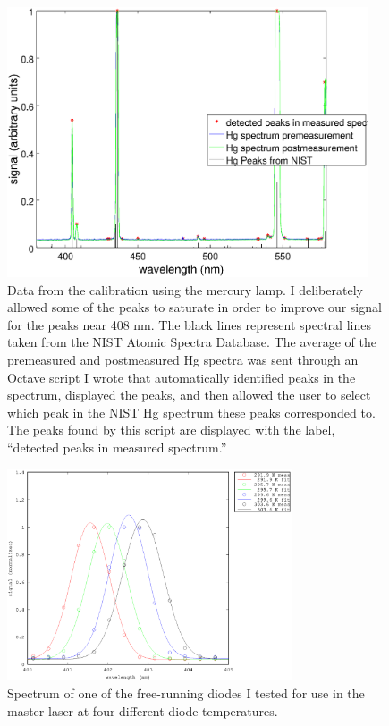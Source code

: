 \begin{figure}
\centering
\includegraphics[width=0.95\textwidth]{calibrationData.eps} 
\caption[Calibration spectrum from Hg lamp]{\label{calibrationData} Data from the calibration using the mercury lamp. I deliberately allowed some of the peaks to saturate in order to improve our signal for the peaks near 408 nm. The black lines represent spectral lines taken from the NIST Atomic Spectra Database\cite{NISTasd}. The average of the premeasured and postmeasured Hg spectra was sent through an Octave script I wrote that automatically identified peaks in the spectrum, displayed the peaks, and then allowed the user to select which peak in the NIST Hg spectrum these peaks corresponded to. The peaks found by this script are displayed with the label, ``detected peaks in measured spectrum.''}
\end{figure}

\begin{figure}
\centering
\includegraphics[width=0.75\textwidth]{temperatureFit.eps} 
\caption[Wavelength of master laser at different temperatures]{\label{Temperaturespectra} Spectrum of one of the free-running diodes I tested for use in the master laser at four different diode temperatures.}
\end{figure}
%


